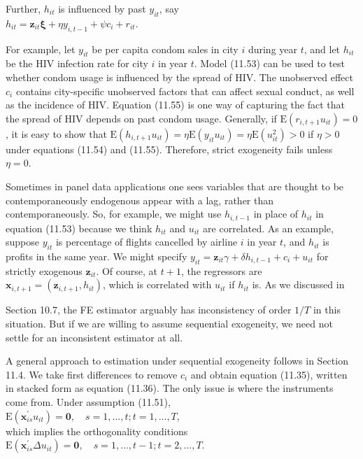 \documentclass[10pt]{article}
\begin{document}
Further, $h_{i t}$ is influenced by past $y_{i t}$, say\\
$h_{i t}=\mathbf{z}_{i t} \boldsymbol{\xi}+\eta y_{i, t-1}+\psi c_{i}+r_{i t}$.

For example, let $y_{i t}$ be per capita condom sales in city $i$ during year $t$, and let $h_{i t}$ be the HIV infection rate for city $i$ in year $t$. Model (11.53) can be used to test whether condom usage is influenced by the spread of HIV. The unobserved effect $c_{i}$ contains city-specific unobserved factors that can affect sexual conduct, as well as the incidence of HIV. Equation (11.55) is one way of capturing the fact that the spread of HIV depends on past condom usage. Generally, if $\mathrm{E}\left(r_{i, t+1} u_{i t}\right)=0$, it is easy to show that $\mathrm{E}\left(h_{i, t+1} u_{i t}\right)=\eta \mathrm{E}\left(y_{i t} u_{i t}\right)=\eta \mathrm{E}\left(u_{i t}^{2}\right)>0$ if $\eta>0$ under equations (11.54) and (11.55). Therefore, strict exogeneity fails unless $\eta=0$.

Sometimes in panel data applications one sees variables that are thought to be contemporaneously endogenous appear with a lag, rather than contemporaneously. So, for example, we might use $h_{i, t-1}$ in place of $h_{i t}$ in equation (11.53) because we think $h_{i t}$ and $u_{i t}$ are correlated. As an example, suppose $y_{i t}$ is percentage of flights cancelled by airline $i$ in year $t$, and $h_{i t}$ is profits in the same year. We might specify $y_{i t}=\mathbf{z}_{i t} \gamma+\delta h_{i, t-1}+c_{i}+u_{i t}$ for strictly exogenous $\mathbf{z}_{i t}$. Of course, at $t+1$, the regressors are $\mathbf{x}_{i, t+1}=\left(\mathbf{z}_{i, t+1}, h_{i t}\right)$, which is correlated with $u_{i t}$ if $h_{i t}$ is. As we discussed in

Section 10.7, the FE estimator arguably has inconsistency of order $1 / T$ in this situation. But if we are willing to assume sequential exogeneity, we need not settle for an inconsistent estimator at all.

A general approach to estimation under sequential exogeneity follows in Section 11.4. We take first differences to remove $c_{i}$ and obtain equation (11.35), written in stacked form as equation (11.36). The only issue is where the instruments come from. Under assumption (11.51),\\
$\mathrm{E}\left(\mathbf{x}_{i s}^{\prime} u_{i t}\right)=\mathbf{0}, \quad s=1, \ldots, t ; t=1, \ldots, T$,\\
which implies the orthogonality conditions\\
$\mathrm{E}\left(\mathbf{x}_{i s}^{\prime} \Delta u_{i t}\right)=\mathbf{0}, \quad s=1, \ldots, t-1 ; t=2, \ldots, T$.
\end{document}
